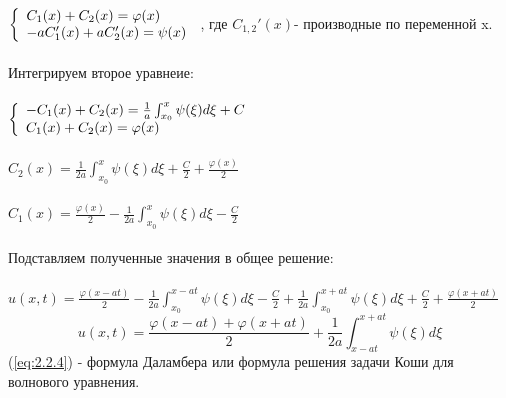 \documentclass[../main.tex]{subfiles}
\begin{document}
$
\begin{left}
\{
\begin{array}{lcl}
 C_{1}(x)+C_2(x)=\varphi(x)\\
-aC_1'(x)+aC_2'(x)=\psi(x)\\
\end{array}
\right.
\end{left}
$
, где $C_{1,2}'(x)$- производные по переменной x.\\
\\Интегрируем второе уравнеие:\\\\
$
\begin{left}
\{
\begin{array}{lcl}
-C_1(x)+C_2(x)=\frac{1}{a}\int_{x_0}^x\psi(\xi)d\xi+C\\
C_1(x)+C_2(x)=\varphi(x)\\
\end{array}
\right.
\end{left}
$
\\\\
$C_2(x)=\frac{1}{2a}\int_{x_0}^x\psi(\xi)d\xi+\frac{C}{2}+\frac{\varphi(x)}{2}$\\\\
$C_1(x)=\frac{\varphi(x)}{2}-\frac{1}{2a}\int_{x_0}^x\psi(\xi)d\xi-\frac{C}{2}$\\\\
Подставляем полученные значения в общее решение:\\\\
$u(x,t)=\frac{\varphi(x-at)}{2}-\frac{1}{2a}\int_{x_0}^{x-at}\psi(\xi)d\xi-\frac{C}{2}+\frac{1}{2a}\int_{x_0}^{x+at}\psi(\xi)d\xi+\frac{C}{2}+\frac{\varphi(x+at)}{2}$
\begin{equation}\label{eq:2.2.4}
u(x,t)=\frac{\varphi(x-at)+\varphi(x+at)}{2}+\frac{1}{2a}\int_{x-at}^{x+at}\psi(\xi)d\xi
\end{equation}
(\ref{eq:2.2.4}) - формула Даламбера или формула решения задачи Коши для волнового уравнения.
\end{document}
